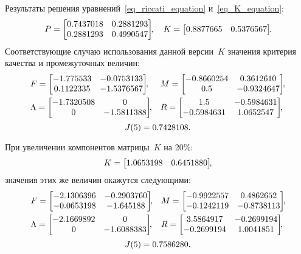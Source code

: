Результаты решения уравнений~\eqref{eq_riccati_equation} и~\eqref{eq_K_equation}:
\begin{equation}
    P = \begin{bmatrix}0.7437018&0.2881293\cr 0.2881293&0.4990547\cr \end{bmatrix}\!\!,
    \quad
    K = \begin{bmatrix}0.8877665&0.5376567\cr \end{bmatrix}\!\!\ldotp
\end{equation}
Соответствующие случаю использования данной версии~$K$ значения критерия качества и промежуточных величин:
\begin{align}
    & F = \begin{bmatrix}-1.775533&-0.0753133\cr 0.1122335&-1.5376567\cr \end{bmatrix}\!\!, &
    & M = \begin{bmatrix}-0.8660254&0.3612610\cr 0.5&-0.9324647\cr \end{bmatrix}\!\!, \\
    & \Lambda = \begin{bmatrix}-1.7320508&0\cr 0&-1.5811388\cr \end{bmatrix}\!\!, &
    & R = \begin{bmatrix}1.5&-0.5984631\cr -0.5984631&1.0652547\cr \end{bmatrix}\!\!,
\end{align}
\begin{equation}
    J(5) = 0.7428108 \ldotp
\end{equation}

При увеличении компонентов матрицы~$K$ на 20\%:
\begin{equation}
    K = \begin{bmatrix}1.0653198&0.6451880\cr \end{bmatrix}\!\!,
\end{equation}
значения этих же величин окажутся следующими:
\begin{align}
    & F = \begin{bmatrix}-2.1306396&-0.2903760\cr -0.0653198&-1.645188\cr \end{bmatrix}\!\!, &
    & M = \begin{bmatrix}-0.9922557&0.4862652\cr -0.1242119&-0.8738113\cr \end{bmatrix}\!\!, \\
    & \Lambda = \begin{bmatrix}-2.1669892&0\cr 0&-1.6088383\cr \end{bmatrix}\!\!, &
    & R = \begin{bmatrix}3.5864917&-0.2699194\cr -0.2699194&1.0041851\cr \end{bmatrix}\!\!,
\end{align}
\begin{equation}
    J(5) = 0.7586280 \ldotp
\end{equation}

